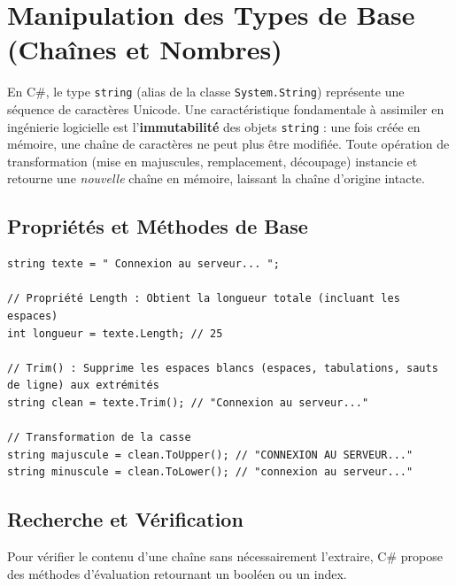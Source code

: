 
\newpage
\section{Manipulation des Types de Base (Chaînes et Nombres)}

En C\#, le type \texttt{string} (alias de la classe \texttt{System.String}) représente une séquence de caractères Unicode. Une caractéristique fondamentale à assimiler en ingénierie logicielle est l'\textbf{immutabilité} des objets \texttt{string} : une fois créée en mémoire, une chaîne de caractères ne peut plus être modifiée. Toute opération de transformation (mise en majuscules, remplacement, découpage) instancie et retourne une \textit{nouvelle} chaîne en mémoire, laissant la chaîne d'origine intacte.

\subsection{Propriétés et Méthodes de Base}

\begin{lstlisting}[style=csharpstyle]
string texte = " Connexion au serveur... ";

// Propriété Length : Obtient la longueur totale (incluant les espaces)
int longueur = texte.Length; // 25

// Trim() : Supprime les espaces blancs (espaces, tabulations, sauts de ligne) aux extrémités
string clean = texte.Trim(); // "Connexion au serveur..."

// Transformation de la casse
string majuscule = clean.ToUpper(); // "CONNEXION AU SERVEUR..."
string minuscule = clean.ToLower(); // "connexion au serveur..."
\end{lstlisting}

\subsection{Recherche et Vérification}

Pour vérifier le contenu d'une chaîne sans nécessairement l'extraire, C\# propose des méthodes d'évaluation retournant un booléen ou un index.

